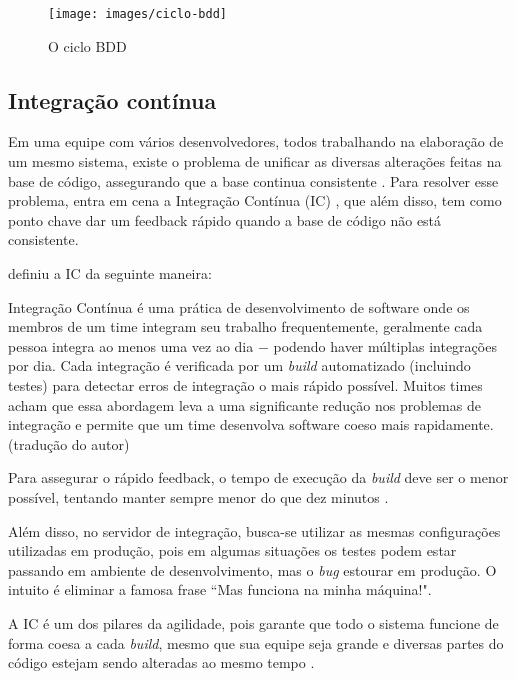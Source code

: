 \begin{figure}[h]
  \center
  \caption{O ciclo BDD}
  \texttt{[image: images/ciclo-bdd]}
  \label{img:ciclo-bdd}
\end{figure}

\subsection{Integração contínua}
\label{sub:integracao_continua}

Em uma equipe com vários desenvolvedores, todos trabalhando na elaboração de um mesmo sistema, existe o problema de unificar as diversas alterações feitas na base de código, assegurando que a base continua consistente \cite{ImproveitCI}. Para resolver esse problema, entra em cena a Integração Contínua (IC) , que além disso, tem como ponto chave dar um feedback rápido quando a base de código não está consistente.

\cite{FowlerCI} definiu a IC da seguinte maneira:

\begin{citacao}
Integração Contínua é uma prática de desenvolvimento de software onde os membros de um time integram seu trabalho frequentemente, geralmente cada pessoa integra ao menos uma vez ao dia $-$ podendo haver múltiplas integrações por dia. Cada integração é verificada por um \textit{build} automatizado (incluindo testes) para detectar erros de integração o mais rápido possível. Muitos times acham que essa abordagem leva a uma significante redução nos problemas de integração e permite que um time desenvolva software coeso mais rapidamente. (tradução do autor)
\end{citacao}

Para assegurar o rápido feedback, o tempo de execução da \textit{build} deve ser o menor possível, tentando manter sempre menor do que dez minutos \cite{FowlerCI}.

Além disso, no servidor de integração, busca-se utilizar as mesmas configurações utilizadas em produção, pois em algumas situações os testes podem estar passando em ambiente de desenvolvimento, mas o \textit{bug} estourar em produção. O intuito é eliminar a famosa frase ``Mas funciona na minha máquina!".

A IC é um dos pilares da agilidade, pois garante que todo o sistema funcione de forma coesa a cada \textit{build}, mesmo que sua equipe seja grande e diversas partes do código estejam sendo alteradas ao mesmo tempo \cite{CaelumCI}.

